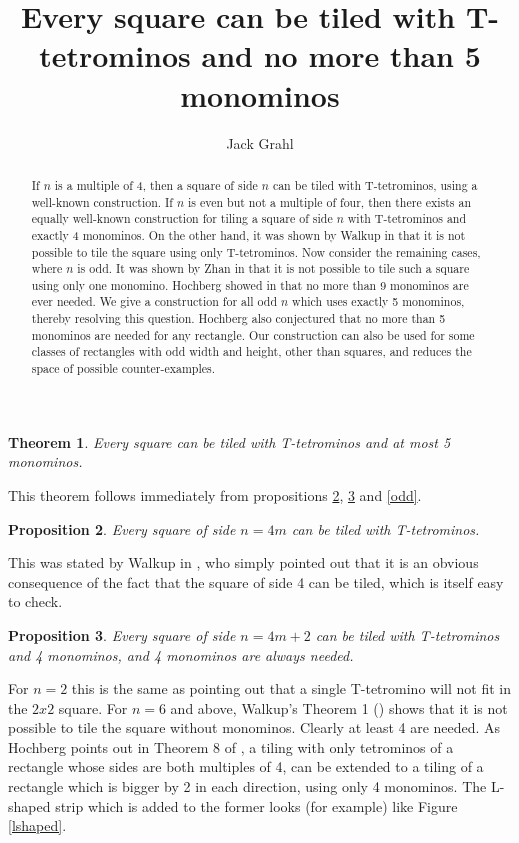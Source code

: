 \documentclass{article}
\title{Every square can be tiled with T-tetrominos and no more than 5 monominos}
\author{Jack Grahl}
\theoremstyle{plain}
\newtheorem{theorem}{Theorem}[section]
\newtheorem{proposition}[theorem]{Proposition}
\begin{document}
\maketitle

\begin{abstract}
If $n$ is a multiple of 4, then a square of side $n$ can be tiled with T-tetrominos, using a well-known construction.
If $n$ is even but not a multiple of four, then there exists an equally well-known construction for tiling a square of side $n$ with T-tetrominos and exactly 4 monominos.
On the other hand, it was shown by Walkup in \cite{walkup} that it is not possible to tile the square using only T-tetrominos.
Now consider the remaining cases, where $n$ is odd.
It was shown by Zhan in \cite{zhan} that it is not possible to tile such a square using only one monomino.
Hochberg showed in \cite{hochberg} that no more than 9 monominos are ever needed.
We give a construction for all odd $n$ which uses exactly 5 monominos, thereby resolving this question.
Hochberg also conjectured that no more than 5 monominos are needed for any rectangle.
Our construction can also be used for some classes of rectangles with odd width and height, other than squares, and reduces the space of possible counter-examples.
\end{abstract}

\begin{theorem}
Every square can be tiled with T-tetrominos and at most 5 monominos.
\end{theorem}
This theorem follows immediately from propositions \ref{four}, \ref{even} and \ref{odd}.

\begin{proposition}\label{four}
Every square of side $n = 4m$ can be tiled with T-tetrominos.
\end{proposition}
This was stated by Walkup in \cite{walkup}, who simply pointed out that it is an obvious consequence of the fact that the square of side 4 can be tiled, which is itself easy to check.

\begin{proposition}\label{even}
Every square of side $n = 4m + 2$ can be tiled with T-tetrominos and 4 monominos, and 4 monominos are always needed.
\end{proposition}
For $n = 2$ this is the same as pointing out that a single T-tetromino will not fit in the $2x2$ square.
For $n=6$ and above, Walkup's Theorem 1 (\cite{walkup}) shows that it is not possible to tile the square without monominos.
Clearly at least 4 are needed.
As Hochberg points out in Theorem 8 of \cite{hochberg}, a tiling with only tetrominos of a rectangle whose sides are both multiples of 4, can be extended to a tiling of a rectangle which is bigger by 2 in each direction, using only 4 monominos.
The L-shaped strip which is added to the former looks (for example) like Figure \ref{lshaped}.
\end{document}
